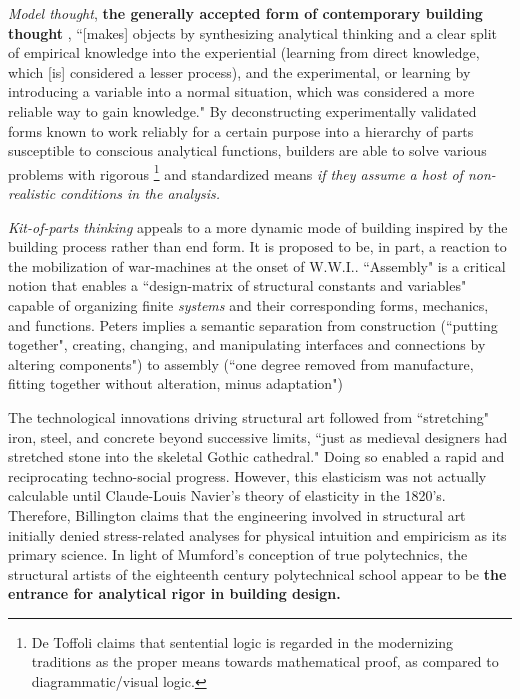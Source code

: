 \textit{Model thought}, \textbf{the generally accepted form of contemporary building thought} \cite[p38]{IRON}, ``[makes] objects by synthesizing analytical thinking and a clear split of empirical knowledge into the experiential (learning from direct knowledge, which [is] considered a lesser process), and the experimental, or learning by introducing a variable into a normal situation, which was considered a more reliable way to gain knowledge." \cite[p39]{IRON} By deconstructing experimentally validated forms known to work reliably for a certain purpose into a hierarchy of parts susceptible to conscious analytical functions, builders are able to solve various problems with rigorous \footnote{De Toffoli claims that sentential logic is regarded in the modernizing traditions as the proper means towards mathematical proof, as compared to diagrammatic/visual logic.} and standardized means \textit{if they assume a host of non-realistic conditions in the analysis.}

\textit{Kit-of-parts thinking} appeals to a more dynamic mode of building inspired by the building process rather than end form. It is proposed to be, in part, a reaction to the mobilization of war-machines at the onset of W.W.I.. ``Assembly" is a critical notion that enables a ``design-matrix of structural constants and variables" capable of organizing finite \textit{systems} and their corresponding forms, mechanics, and functions. Peters implies a semantic separation from construction (``putting together", creating, changing, and manipulating interfaces and connections by altering components") to assembly (``one degree removed from manufacture, fitting together without alteration, minus adaptation") \cite[p53]{IRON}




The technological innovations driving structural art followed from ``stretching" iron, steel, and concrete beyond successive limits, ``just as medieval designers had stretched stone into the skeletal Gothic cathedral." \cite[p5]{TOWERANDBRIDGE} Doing so enabled a rapid and reciprocating techno-social progress. However, this elasticism was not actually calculable until Claude-Louis Navier's theory of elasticity in the 1820's. \cite[p73]{RETROFITTINGMASONRY} Therefore, Billington claims that the engineering involved in structural art initially denied stress-related analyses for physical intuition and empiricism as its primary science. \cite[p43]{TOWERANDBRIDGE} In light of Mumford's conception of true polytechnics, the structural artists of the eighteenth century polytechnical school appear to be \textbf{the entrance for analytical rigor in building design.}


